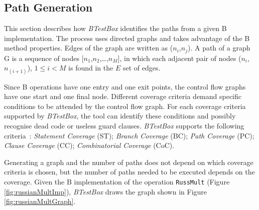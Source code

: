\documentclass[runningheads]{llncs}
\begin{document}
\subsection{Path Generation}

This section describes how \textit{BTestBox} identifies the paths from a given B implementation. 
The process uses directed graphs and takes advantage of the B method properties. 
Edges of the graph are written as ($n_i$,$n_j$).
A path of a graph G is a sequence of nodes [$n_1$,$n_2$,\ldots,$n_M$], in which each adjacent pair of nodes ($n_i$, $n_{(i+1)}$), $1 \leq i < M$ is found in the $E$ set of edges.

Since B operations have one entry and one exit points, the control flow graphs have one start and one final node.
Different coverage criteria demand specific conditions to be attended by the control flow graph.
For each coverage criteria supported by \textit{BTestBox}, the tool can identify these conditions and possibly recognise dead code or useless guard clauses. 
\textit{BTestBox} supports the following criteria~\cite{ammann2008introduction}:
\textit{Statement Coverage} (ST); 
\textit{Branch Coverage} (BC);
\textit{Path Coverage} (PC);
\textit{Clause Coverage} (CC);
\textit{Combinatorial Coverage} (CoC).

Generating a graph and the number of paths does not depend on which coverage criteria is chosen, but the number of paths needed to be executed depends on the coverage. 
Given the B implementation of the operation \texttt{RussMult} (Figure \ref{fig:russianMultImp}), \textit{BTestBox} draws the graph shown in Figure \ref{fig:russianMultGraph}.
        
\end{document}
